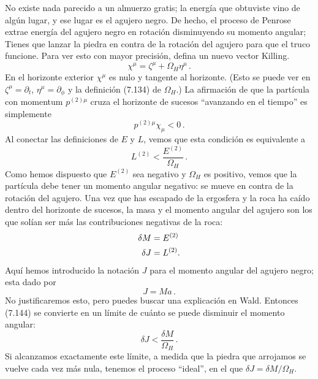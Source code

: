 \documentclass[11pt,b5paper,openany,twoside]{book}
\newcommand{\p}[1]{{\partial_{#1}}}
\begin{document}
No existe nada parecido a un almuerzo gratis; la energía que obtuviste vino de algún lugar, y ese lugar es el agujero negro.
De hecho, el proceso de Penrose extrae energía del agujero negro en rotación disminuyendo su momento angular; Tienes que lanzar la piedra en contra de la rotación del agujero para que el truco funcione.
Para ver esto con mayor precisión, defina un nuevo vector Killing.
\begin{equation}
\chi^\mu = \zeta^\mu + \Omega_H\eta^\mu\,.\label{7.142}
\end{equation}
En el horizonte exterior $\chi^\mu$ es nulo y tangente al horizonte.
(Esto se puede ver en $\zeta^\mu = \p{t}$, $\eta^\mu=\p\phi$ y la definición (7.134) de $\Omega_H$.)
La afirmación de que la partícula con momentum $p^{(2)\mu}$ cruza el horizonte de sucesos ``avanzando en el tiempo'' es simplemente
\begin{equation}
p^{(2)\mu}\chi_\mu <0\,.\label{7.143}
\end{equation}
Al conectar las definiciones de $E$ y $L$, vemos que esta condición es equivalente a
\begin{equation}
L^{(2)} < \frac{E^{(2)}}{\Omega_H} \,.\label{7.144}
\end{equation}
Como hemos dispuesto que $E^{(2)}$ sea negativo y $\Omega_H$ es positivo, vemos que la partícula debe tener un momento angular negativo: se mueve en contra de la rotación del agujero.
Una vez que has escapado de la ergosfera y la roca ha caído dentro del horizonte de sucesos, la masa y el momento angular del agujero son los que solían ser más las contribuciones negativas de la roca:
\begin{align}
\delta M  &=  E^{(2)} \notag \\  \delta J  &=  L^{(2)}.
\label{7.145}
\end{align}
Aquí hemos introducido la notación $J$ para el momento angular del agujero negro; esta dado por
\begin{equation}
J=Ma\,.\label{7.146}
\end{equation}
No justificaremos esto, pero puedes buscar una explicación en Wald.
Entonces (7.144) se convierte en un límite de cuánto se puede disminuir el momento angular:
\begin{equation}
\delta J < \frac{\delta M}{\Omega_H}\,.
\label{7.147}
\end{equation}
Si alcanzamos exactamente este límite, a medida que la piedra que arrojamos se vuelve cada vez más nula, tenemos el proceso ``ideal'', en el que $\delta J=\delta M/\Omega_H$.
\end{document}

